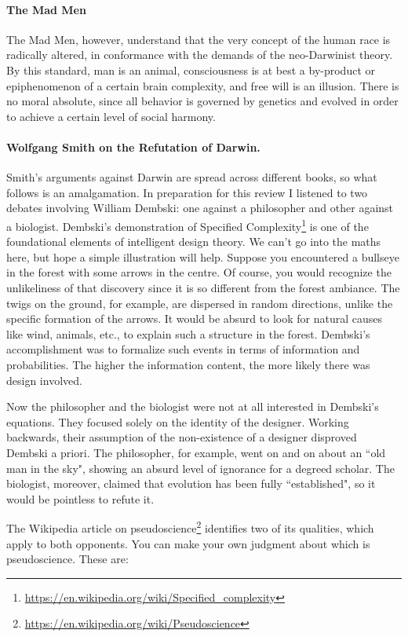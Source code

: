 \paragraph{The Mad Men}
The Mad Men, however, understand that the very concept of the human race is radically altered, in conformance with the demands of the neo-Darwinist theory. By this standard, man is an animal, consciousness is at best a by-product or epiphenomenon of a certain brain complexity, and free will is an illusion. There is no moral absolute, since all behavior is governed by genetics and evolved in order to achieve a certain level of social harmony.

\paragraph{Wolfgang Smith on the Refutation of Darwin.}
Smith's arguments against Darwin are spread across different books, so what follows is an amalgamation. In preparation for this review I listened to two debates involving William Dembski: one against a philosopher and other against a biologist. Dembski's demonstration of Specified Complexity\footnote{\url{https://en.wikipedia.org/wiki/Specified_complexity}} is one of the foundational elements of intelligent design theory. We can't go into the maths here, but hope a simple illustration will help. Suppose you encountered a bullseye in the forest with some arrows in the centre. Of course, you would recognize the unlikeliness of that discovery since it is so different from the forest ambiance. The twigs on the ground, for example, are dispersed in random directions, unlike the specific formation of the arrows. It would be absurd to look for natural causes like wind, animals, etc., to explain such a structure in the forest. Dembski's accomplishment was to formalize such events in terms of information and probabilities. The higher the information content, the more likely there was design involved.

Now the philosopher and the biologist were not at all interested in Dembski's equations. They focused solely on the identity of the designer. Working backwards, their assumption of the non-existence of a designer disproved Dembski a priori. The philosopher, for example, went on and on about an ``old man in the sky", showing an absurd level of ignorance for a degreed scholar. The biologist, moreover, claimed that evolution has been fully ``established", so it would be pointless to refute it.

The Wikipedia article on pseudoscience\footnote{\url{https://en.wikipedia.org/wiki/Pseudoscience}} identifies two of its qualities, which apply to both opponents. You can make your own judgment about which is pseudoscience. These are:

